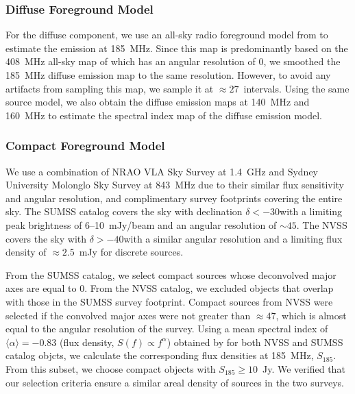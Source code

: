 \documentclass[preprint2,iop,numberedappendix]{emulateapj}
\begin{document}
\subsubsection{Diffuse Foreground Model}\label{sec:DSM}

For the diffuse component, we use an all-sky radio foreground model from \citet{deo08} to estimate the emission at 185~MHz. Since this map is predominantly based on the 408~MHz all-sky map of \citet{has82} which has an angular resolution of 0, we smoothed the 185~MHz diffuse emission map to the same resolution. However, to avoid any artifacts from sampling this map, we sample it at $\approx 27$\arcmin~intervals. Using the same source model, we also obtain the diffuse emission maps at 140~MHz and 160~MHz to estimate the spectral index map of the diffuse emission model. 

\subsubsection{Compact Foreground Model}\label{sec:CSM}

We use a combination of NRAO VLA Sky Survey \citep[NVSS;][]{con98} at 1.4~GHz and Sydney University Molonglo Sky Survey \citep[SUMSS;][]{boc99,mau03} at 843~MHz due to their similar flux sensitivity and angular resolution, and complimentary survey footprints covering the entire sky. The SUMSS catalog covers the sky with declination $\delta < -30$\arcdeg with a limiting peak brightness of 6--10~mJy/beam and an angular resolution of $\sim 45$\arcsec. The NVSS covers the sky with $\delta > -40$\arcdeg with a similar angular resolution and a limiting flux density of $\approx 2.5$~mJy for discrete sources. 

From the SUMSS catalog, we select compact sources whose deconvolved major axes are equal to 0. From the NVSS catalog, we excluded objects that overlap with those in the SUMSS survey footprint. Compact sources from NVSS were selected if the convolved major axes were not greater than $\approx 47$\arcsec, which is almost equal to the angular resolution of the survey. Using a mean spectral index of $\langle\alpha\rangle=-0.83$ (flux density, $S(f)\propto f^\alpha$) obtained by \citet{mau03} for both NVSS and SUMSS catalog objcts, we calculate the corresponding flux densities at 185~MHz, $S_{185}$. From this subset, we choose compact objects with $S_{185}\geq 10$~Jy. We verified that our selection criteria ensure a similar areal density of sources in the two surveys. 
\end{document}

